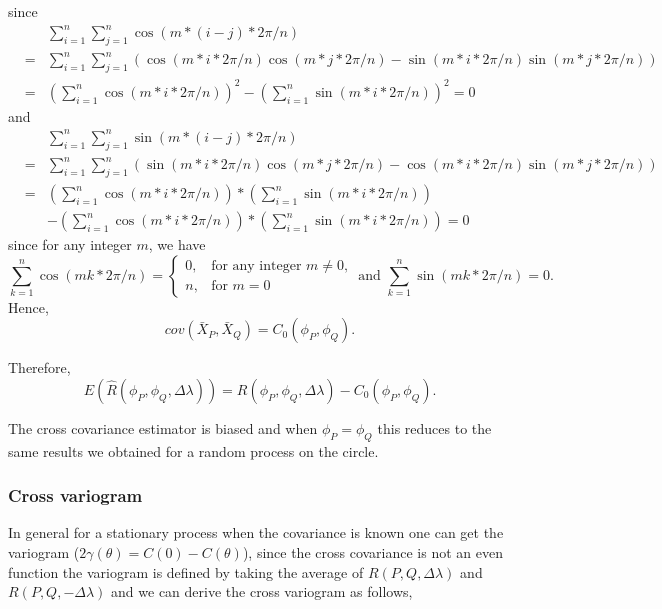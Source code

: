 	since
	\begin{eqnarray*}
		& & \sum_{i = 1}^n \sum_{j=1}^n \cos(m*(i-j)*2\pi/n) \\
		&=& \sum_{i=1}^n \sum_{j=1}^n \left(\cos(m*i *2\pi/n)\cos(m*j*2\pi/n) - \sin(m*i *2\pi/n)\sin(m*j*2\pi/n) \right)\\
		&=& \left(\sum_{i=1}^n \cos(m*i *2\pi/n)\right)^2 - \left(\sum_{i=1}^n \sin(m*i *2\pi/n)\right)^2 = 0
	\end{eqnarray*}
	and
	\begin{eqnarray*}
		& & \sum_{i = 1}^n \sum_{j=1}^n \sin(m*(i-j)*2\pi/n) \\
		&=& \sum_{i=1}^n \sum_{j=1}^n \left(\sin(m*i *2\pi/n)\cos(m*j*2\pi/n) - \cos(m*i *2\pi/n)\sin(m*j*2\pi/n) \right)\\
		&=& \left(\sum_{i=1}^n \cos(m*i *2\pi/n)\right)* \left(\sum_{i=1}^n \sin(m*i *2\pi/n)\right) \\
		& & - \left(\sum_{i=1}^n \cos(m*i *2\pi/n)\right)* \left(\sum_{i=1}^n \sin(m*i *2\pi/n)\right) = 0
	\end{eqnarray*}
	since for any integer $m$, we have
	\[
		\sum_{k = 1}^{n} \cos(mk*2\pi/n) = \left\{\begin{array}{cc}
		0, & \mbox{for any integer $m \ne 0$,}  \\
		n, & \mbox{for $m = 0$}
		\end{array}
		\right. \mbox{ and }
		\sum_{k = 1}^{n} \sin(mk*2\pi/n) = 0.
	\]
	Hence,
	\[
		cov(\bar{X}_P, \bar{X}_Q) = C_0 (\phi_P, \phi_Q).
	\]
	
	Therefore,
	\[
		E(\hat{R}(\phi_P, \phi_Q, \Delta \lambda)) = R(\phi_P, \phi_Q, \Delta \lambda) - C_0 (\phi_P, \phi_Q).
	\]
	
	The cross covariance estimator is biased and  when $\phi_P = \phi_Q$ this reduces to the same results we obtained for a random process on the circle.  
		
	\subsubsection{Cross variogram}
		
	In general for a stationary process when the covariance is known one can get the variogram ($2\gamma (\theta) = C(0) - C(\theta)$), since the cross covariance is not an even function the variogram is defined by taking the average of $R(P,Q, \Delta\lambda)$ and $R(P,Q,-\Delta\lambda)$ and we can derive the cross variogram as follows, 
		
